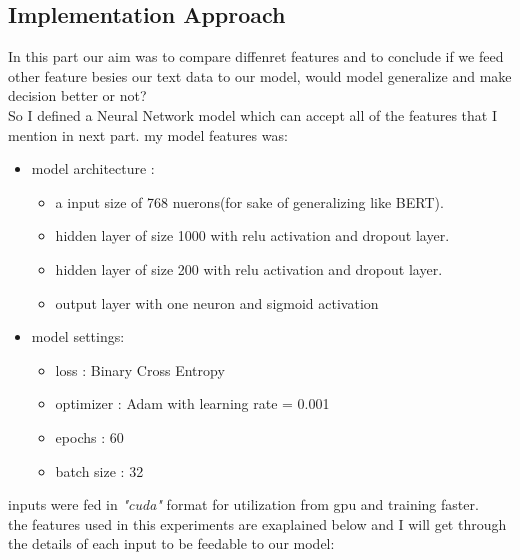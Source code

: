 \documentclass[10pt, a4paper]{article}
\begin{document}
\subsection{Implementation Approach}
In this part our aim was to compare diffenret features and to conclude if we feed other feature besies our text data to our model, would model generalize and make decision better or not?
\\
So I defined a Neural Network model which can accept all of the features that I mention in next part. my model features was:
\begin{itemize}
    \item model architecture :
          \begin{itemize}
              \item a input size of 768 nuerons(for sake of generalizing like BERT).
              \item hidden layer of size 1000 with relu activation and dropout layer.
              \item hidden layer of size 200 with relu activation and dropout layer.
              \item output layer with one neuron and sigmoid activation
          \end{itemize}
    \item model settings:
          \begin{itemize}
              \item loss : Binary Cross Entropy
              \item optimizer : Adam with learning rate = 0.001
              \item epochs : 60
              \item batch size : 32
          \end{itemize}
\end{itemize}
inputs were fed in \textit{"cuda"} format for utilization from gpu and training faster.
\\
the features used in this experiments are exaplained below and I will get through the details of each input to be feedable to our model:
\end{document}
